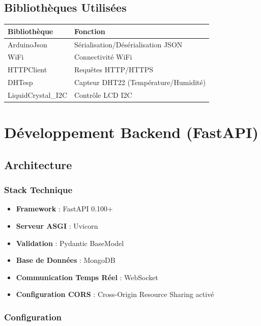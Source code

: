\documentclass[12pt,french]{report}
\begin{document}
\section{Bibliothèques Utilisées}

\begin{table}[h]
\centering
\begin{tabular}{|l|l|}
\hline
\textbf{Bibliothèque} & \textbf{Fonction} \\
\hline
ArduinoJson & Sérialisation/Désérialisation JSON \\
WiFi & Connectivité WiFi \\
HTTPClient & Requêtes HTTP/HTTPS \\
DHTesp & Capteur DHT22 (Température/Humidité) \\
LiquidCrystal\_I2C & Contrôle LCD I2C \\
\hline
\end{tabular}
\end{table}

\chapter{Développement Backend (FastAPI)}

\section{Architecture}

\subsection{Stack Technique}

\begin{itemize}
    \item \textbf{Framework} : FastAPI 0.100+
    \item \textbf{Serveur ASGI} : Uvicorn
    \item \textbf{Validation} : Pydantic BaseModel
    \item \textbf{Base de Données} : MongoDB
    \item \textbf{Communication Temps Réel} : WebSocket
    \item \textbf{Configuration CORS} : Cross-Origin Resource Sharing activé
\end{itemize}

\subsection{Configuration}
\end{document}
